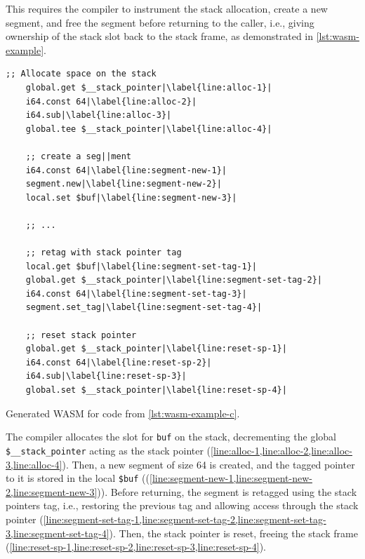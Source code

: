 \noindent
This requires the compiler to instrument the stack allocation, create a new segment, and free the segment before returning to the caller, i.e., giving ownership of the stack slot back to the stack frame, as demonstrated in \cref{lst:wasm-example}.

\begin{lstfloat}
    \begin{lstlisting}[frame=h,style=customwasm,
        label={lst:wasm-example-inner},escapechar=|]
    ;; Allocate space on the stack
    global.get $__stack_pointer|\label{line:alloc-1}|
    i64.const 64|\label{line:alloc-2}|
    i64.sub|\label{line:alloc-3}|
    global.tee $__stack_pointer|\label{line:alloc-4}|

    ;; create a seg||ment
    i64.const 64|\label{line:segment-new-1}|
    segment.new|\label{line:segment-new-2}|
    local.set $buf|\label{line:segment-new-3}|

    ;; ...

    ;; retag with stack pointer tag
    local.get $buf|\label{line:segment-set-tag-1}|
    global.get $__stack_pointer|\label{line:segment-set-tag-2}|
    i64.const 64|\label{line:segment-set-tag-3}|
    segment.set_tag|\label{line:segment-set-tag-4}|

    ;; reset stack pointer
    global.get $__stack_pointer|\label{line:reset-sp-1}|
    i64.const 64|\label{line:reset-sp-2}|
    i64.sub|\label{line:reset-sp-3}|
    global.set $__stack_pointer|\label{line:reset-sp-4}|
    \end{lstlisting}
    \caption{Generated \ac{WASM} for code from \cref{lst:wasm-example-c}.}
    \label{lst:wasm-example}
\end{lstfloat}

The compiler allocates the slot for \texttt{buf} on the stack, decrementing the global \texttt{\$\_\_stack\_pointer} acting as the stack pointer (\cref{line:alloc-1,line:alloc-2,line:alloc-3,line:alloc-4}).
Then, a new segment of size 64 is created, and the tagged pointer to it is stored in the local \lstinline[style=customwasm]{$buf} ((\cref{line:segment-new-1,line:segment-new-2,line:segment-new-3})).
Before returning, the segment is retagged using the stack pointers tag, i.e., restoring the previous tag and allowing access through the stack pointer (\cref{line:segment-set-tag-1,line:segment-set-tag-2,line:segment-set-tag-3,line:segment-set-tag-4}).
Then, the stack pointer is reset, freeing the stack frame (\cref{line:reset-sp-1,line:reset-sp-2,line:reset-sp-3,line:reset-sp-4}).

